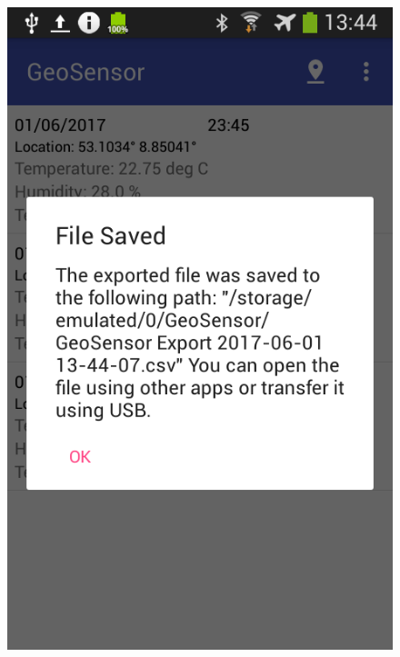 \begin{figure}
\centering
\begin{minipage}{.5\textwidth}
  \centering
  \includegraphics[width=.8\linewidth]{src/export_old.png}
\end{minipage}%
\begin{minipage}{.5\textwidth}
  \centering

\end{minipage}
\end{figure}

